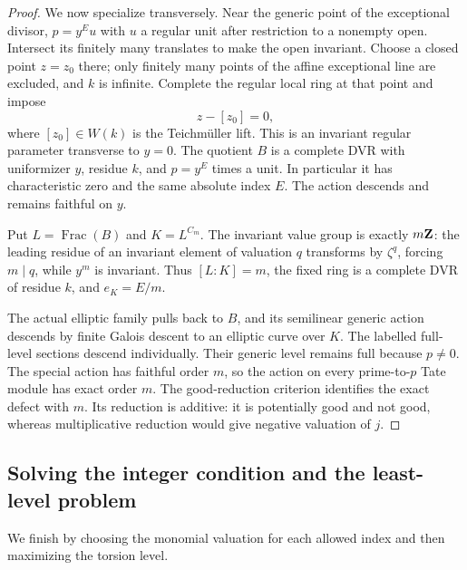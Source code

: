 \begin{proof}
We now specialize transversely. Near the generic point of the exceptional divisor, $p=y^E u$ with $u$ a regular unit after restriction to a nonempty open. Intersect its finitely many translates to make the open invariant. Choose a closed point $z=z_0$ there; only finitely many points of the affine exceptional line are excluded, and $k$ is infinite. Complete the regular local ring at that point and impose
\[
 z-[z_0]=0,
\]
where $[z_0]\in W(k)$ is the Teichm\"uller lift. This is an invariant regular parameter transverse to $y=0$. The quotient $B$ is a complete DVR with uniformizer $y$, residue $k$, and $p=y^E$ times a unit. In particular it has characteristic zero and the same absolute index $E$. The action descends and remains faithful on $y$.

Put $L=\operatorname{Frac}(B)$ and $K=L^{C_m}$. The invariant value group is exactly $m\mathbf Z$: the leading residue of an invariant element of valuation $q$ transforms by $\zeta^q$, forcing $m\mid q$, while $y^m$ is invariant. Thus $[L:K]=m$, the fixed ring is a complete DVR of residue $k$, and $e_K=E/m$.

The actual elliptic family pulls back to $B$, and its semilinear generic action descends by finite Galois descent to an elliptic curve over $K$. The labelled full-level sections descend individually. Their generic level remains full because $p\ne0$. The special action has faithful order $m$, so the action on every prime-to-$p$ Tate module has exact order $m$. The good-reduction criterion identifies the exact defect with $m$. Its reduction is additive: it is potentially good and not good, whereas multiplicative reduction would give negative valuation of $j$.
\end{proof}

\subsection{Solving the integer condition and the least-level problem}
We finish by choosing the monomial valuation for each allowed index and then maximizing the torsion level.


